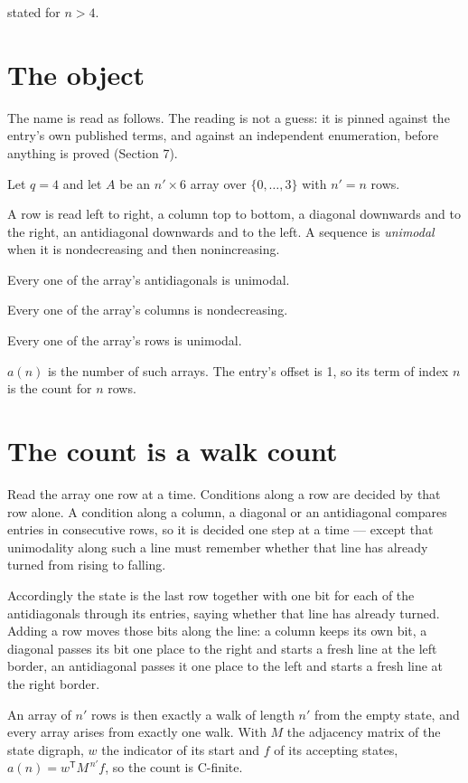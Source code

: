 \documentclass[11pt]{article}
\theoremstyle{definition}
\begin{document}
stated for $n > 4$.

\section{The object}

The name is read as follows. The reading is not a guess: it is pinned against the entry's own published terms, and against an independent enumeration, before anything is proved (Section 7).

Let $q = 4$ and let $A$ be an $n' \times 6$ array over $\{0,\dots,3\}$ with $n' = n$ rows.

A row is read left to right, a column top to bottom, a diagonal downwards and to the right, an antidiagonal downwards and to the left. A sequence is {\itshape unimodal} when it is nondecreasing and then nonincreasing.

Every one of the array's antidiagonals is unimodal.

Every one of the array's columns is nondecreasing.

Every one of the array's rows is unimodal.

$a(n)$ is the number of such arrays. The entry's offset is 1, so its term of index $n$ is the count for $n$ rows.

\section{The count is a walk count}

Read the array one row at a time. Conditions along a row are decided by that row alone. A condition along a column, a diagonal or an antidiagonal compares entries in consecutive rows, so it is decided one step at a time --- except that unimodality along such a line must remember whether that line has already turned from rising to falling.

Accordingly the state is the last row together with one bit for each of the antidiagonals through its entries, saying whether that line has already turned. Adding a row moves those bits along the line: a column keeps its own bit, a diagonal passes its bit one place to the right and starts a fresh line at the left border, an antidiagonal passes it one place to the left and starts a fresh line at the right border.

An array of $n'$ rows is then exactly a walk of length $n'$ from the empty state, and every array arises from exactly one walk. With $M$ the adjacency matrix of the state digraph, $w$ the indicator of its start and $f$ of its accepting states, $a(n) = w^{\mathsf T}M^{\,n'}f$, so the count is C-finite.
\end{document}
